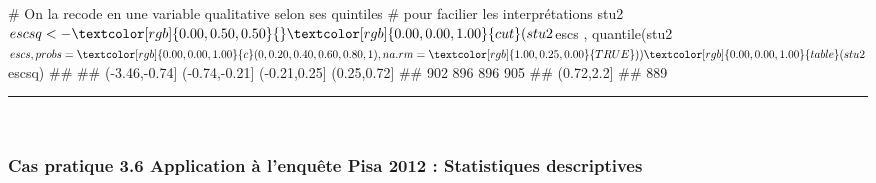\documentclass[12pt,twosided, notitlepage]{book}
\newenvironment{Shaded}{}{}
\newcommand{\KeywordTok}[1]{\textcolor[rgb]{0.00,0.00,1.00}{#1}}
\newcommand{\DataTypeTok}[1]{#1}
\newcommand{\DecValTok}[1]{#1}
\newcommand{\FloatTok}[1]{#1}
\newcommand{\StringTok}[1]{\textcolor[rgb]{0.00,0.50,0.50}{#1}}
\newcommand{\CommentTok}[1]{\textcolor[rgb]{0.00,0.50,0.00}{#1}}
\newcommand{\OtherTok}[1]{\textcolor[rgb]{1.00,0.25,0.00}{#1}}
\newcommand{\OperatorTok}[1]{#1}
\newcommand{\NormalTok}[1]{#1}
\renewenvironment{Shaded}{\begin{snugshade}}{\end{snugshade}}
\begin{document}
\begin{enumerate}
\begin{enumerate}
\begin{Shaded}
\begin{Highlighting}[]
\CommentTok{# On la recode en une variable qualitative selon ses quintiles}
\CommentTok{# pour facilier les interprétations}
\NormalTok{stu2}\OperatorTok{$}\NormalTok{escsq <-}\StringTok{  }\KeywordTok{cut}\NormalTok{(}
\NormalTok{  stu2}\OperatorTok{$}\NormalTok{escs}
\NormalTok{  , }\KeywordTok{quantile}\NormalTok{(stu2}\OperatorTok{$}\NormalTok{escs, }\DataTypeTok{probs =} \KeywordTok{c}\NormalTok{(}\DecValTok{0}\NormalTok{, }\FloatTok{0.20}\NormalTok{, }\FloatTok{0.40}\NormalTok{, }\FloatTok{0.60}\NormalTok{, }\FloatTok{0.80}\NormalTok{, }\DecValTok{1}\NormalTok{), }\DataTypeTok{na.rm =} \OtherTok{TRUE}\NormalTok{)}
\NormalTok{)}
\KeywordTok{table}\NormalTok{(stu2}\OperatorTok{$}\NormalTok{escsq)}
\NormalTok{  ## }
\NormalTok{  ## (-3.46,-0.74] (-0.74,-0.21]  (-0.21,0.25]   (0.25,0.72] }
\NormalTok{  ##           902           896           896           905 }
\NormalTok{  ##    (0.72,2.2] }
\NormalTok{  ##           889}
\end{Highlighting}
\end{Shaded}

    \begin{center} \rule{0.5\linewidth}{\linethickness}\end{center}

    \bigskip  \fi 
  \end{enumerate}
\end{enumerate}

~

\subsubsection{\texorpdfstring{\textbf{Cas pratique 3.6} Application à
l'enquête Pisa 2012 : Statistiques
descriptives}{Cas pratique 3.6 Application à l'enquête Pisa 2012 : Statistiques descriptives}}\label{cas-pratique-3.6-application-a-lenquete-pisa-2012-statistiques-descriptives}

\end{document}
